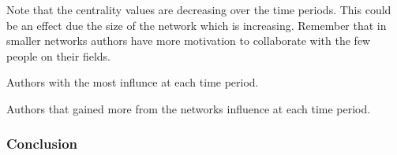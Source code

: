 \documentclass{article}
\theoremstyle{definition}
\begin{document}
Note that the centrality values are decreasing over the time periods. This could
be an effect due the size of the network which is increasing. Remember that
in smaller networks authors have more motivation to collaborate with the 
few people on their fields.

\begin{table}[!hbtp]
    \begin{center}
    \scalebox{0.8}{
    }
    \caption{Authors with the most influnce at each time period.}
    \label{table:cc_over_time}
    \end{center}
\end{table}

\begin{table}[!hbtp]
    \begin{center}
    \scalebox{0.8}{
    }
    \caption{Authors that gained more from the networks influence at each
    time period.}
    \label{table:bc_over_time}
    \end{center}
\end{table}

\subsubsection{Conclusion}



\end{document}
